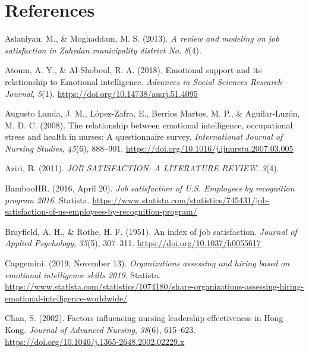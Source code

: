 \documentclass[
  man,
  longtable,
  nolmodern,
  notxfonts,
  notimes,
  colorlinks=true,linkcolor=blue,citecolor=blue,urlcolor=blue]{apa7}
\newlength{\cslhangindent}
\newenvironment{CSLReferences}[2] %
 {\begin{list}{}{%
  \setlength{\itemindent}{0pt}
  \setlength{\leftmargin}{0pt}
  \setlength{\parsep}{0pt}
  \ifodd #1
   \setlength{\leftmargin}{\cslhangindent}
   \setlength{\itemindent}{-1\cslhangindent}
  \fi
  \setlength{\itemsep}{#2\baselineskip}}}
 {\end{list}}
\begin{document}
\section*{References}\label{references}

\label{refs}
\begin{CSLReferences}{1}{0}
Aslaniyan, M., \& Moghaddam, M. S. (2013). \emph{A review and modeling
on job satisfaction in {Zahedan} municipality district {No}.}
\emph{8}(4).

Atoum, A. Y., \& Al-Shoboul, R. A. (2018). Emotional support and its
relationship to {Emotional} intelligence. \emph{Advances in Social
Sciences Research Journal}, \emph{5}(1).
\url{https://doi.org/10.14738/assrj.51.4095}

Augusto Landa, J. M., López-Zafra, E., Berrios Martos, M. P., \&
Aguilar-Luzón, M. D. C. (2008). The relationship between emotional
intelligence, occupational stress and health in nurses: {A}
questionnaire survey. \emph{International Journal of Nursing Studies},
\emph{45}(6), 888--901.
\url{https://doi.org/10.1016/j.ijnurstu.2007.03.005}

Aziri, B. (2011). \emph{{JOB SATISFACTION}: {A LITERATURE REVIEW}}.
\emph{3}(4).

BambooHR. (2016, April 20). \emph{Job satisfaction of {U}.{S}. Employees
by recognition program 2016}. Statista.
\url{https://www.statista.com/statistics/745431/job-satisfaction-of-us-employees-by-recognition-program/}

Brayfield, A. H., \& Rothe, H. F. (1951). An index of job satisfaction.
\emph{Journal of Applied Psychology}, \emph{35}(5), 307--311.
\url{https://doi.org/10.1037/h0055617}

Capgemini. (2019, November 13). \emph{Organizations assessing and hiring
based on emotional intelligence skills 2019}. Statista.
\url{https://www.statista.com/statistics/1074180/share-organizations-assessing-hiring-emotional-intelligence-worldwide/}

Chan, S. (2002). Factors influencing nursing leadership effectiveness in
{Hong Kong}. \emph{Journal of Advanced Nursing}, \emph{38}(6), 615--623.
\url{https://doi.org/10.1046/j.1365-2648.2002.02229.x}


\end{CSLReferences}
\end{document}
